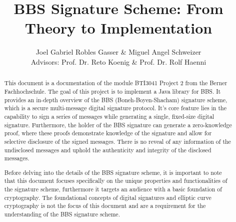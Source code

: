 \documentclass{article}
\title{BBS Signature Scheme: From Theory to Implementation}
\author{Joel Gabriel Robles Gasser \& Miguel Angel Schweizer\\[1cm]{\small Advisors: Prof. Dr. Reto Koenig \& Prof. Dr. Rolf Haenni}}
\begin{document}
\maketitle

\begin{abstract}
This document is a documentation of the module BTI3041 Project 2 from the Berner Fachhochschule. The goal of this project is to implement a Java library for \gls{BBS}. 
It provides an in-depth overview of the BBS (Boneh-Boyen-Shacham) signature scheme, which is a secure multi-message digital signature protocol. It's core feature lies in the capability to sign a series of messages while generating a single, fixed-size digital signature. Furthermore, the holder of the BBS signature can generate a zero-knowledge proof, where these proofs demonstrate knowledge of the signature and allow for selective disclosure of the signed messages. There is no reveal of any information of the undisclosed messages and uphold the authenticity and integrity of the disclosed messages.  \newline

Before delving into the details of the BBS signature scheme, it is important to note that this document focuses specifically on the unique properties and functionalities of the signature scheme, furthermore it targets an audience with a basic foundation of cryptography. The foundational concepts of digital signatures and elliptic curve cryptography is not the focus of this document and are a requirement for the understanding of the BBS signature scheme. \cite{bbs-signature-identity}
\end{abstract}
\clearpage

\tableofcontents

\clearpage
\end{document}

